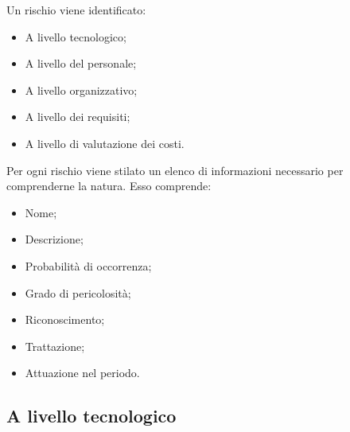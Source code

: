 	Un rischio viene identificato: 
	
	\begin{itemize}
		\item A livello tecnologico; 
		\item A livello del personale;
		\item A livello organizzativo;
		\item A livello dei requisiti;
		\item A livello di valutazione dei costi.
	\end{itemize}
	
	Per ogni rischio viene stilato un elenco di informazioni necessario per comprenderne la natura. Esso comprende: 
	
	\begin{itemize}
		\item Nome; 
		\item Descrizione;
		\item Probabilità di occorrenza;
		\item Grado di pericolosità;
		\item Riconoscimento;
		\item Trattazione;
		\item Attuazione nel periodo.
	\end{itemize}

	\subsection{A livello tecnologico}
	
